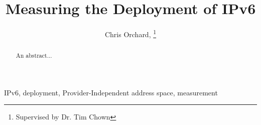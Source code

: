 \documentclass[final, technote, a4paper]{IEEEtran}
\begin{document}
\title{Measuring the Deployment of IPv6}

\author{Chris Orchard, \thanks{Supervised by Dr. Tim Chown}}


\maketitle

\begin{abstract}
An abstract...
\end{abstract}

\begin{IEEEkeywords}
IPv6, deployment, Provider-Independent address space, measurement
\end{IEEEkeywords}









{}
\end{document}
